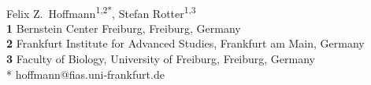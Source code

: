 \begin{flushleft}
{\Large
\textbf{} %
}
\newline
\\
Felix Z.~Hoffmann\textsuperscript{1,2*},
Stefan Rotter\textsuperscript{1,3}
\\
\medskip
\textbf{1} Bernstein Center Freiburg, Freiburg, Germany
\\
\textbf{2} Frankfurt Institute for Advanced Studies, Frankfurt am Main, Germany
\\
\textbf{3} Faculty of Biology, University of Freiburg, Freiburg,
Germany\\[0.3cm]
%
* hoffmann@fias.uni-frankfurt.de

\end{flushleft}
